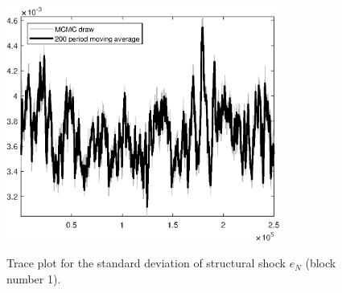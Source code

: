 \begin{figure}[H]
\centering
  \includegraphics[width=0.8\textwidth]{BRS_imp_mobility/graphs/TracePlot_SE_e_N_blck_1}\\
    \caption{Trace plot for the standard deviation of structural shock ${e_N}$ (block number 1).}
\end{figure}
